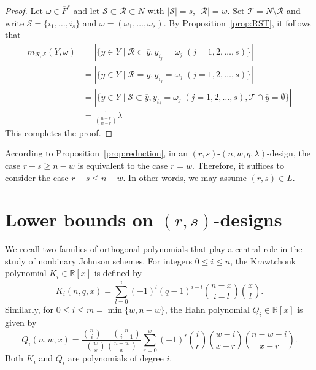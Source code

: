 \documentclass[a4paper, 11pt]{article}
\theoremstyle{definition}
\begin{document}
\begin{proof}
Let $\omega \in \overline{F}^{s}$ and let $\mathcal{S} \subset \mathcal{R} \subset N$ with $|\mathcal{S}| = s$, $|\mathcal{R}| = w$.
Set $\mathcal{T} = N \setminus \mathcal{R}$
and write $\mathcal{S} = \{i_1,\ldots,i_s\}$ and $\omega = (\omega_1,\ldots,\omega_s)$.
By Proposition~\ref{prop:RST}, it follows that
\begin{align*}
m_{\mathcal{R},\mathcal{S}}(Y,\omega) &= |\{y \in Y \mid \mathcal{R} \subset \overline{y}, y_{i_j} = \omega_j \; (j = 1,2,\ldots,s)\}| \\
&= |\{y \in Y \mid \mathcal{R} = \overline{y}, y_{i_j} = \omega_j \; (j = 1,2,\ldots,s)\}| \\
&= |\{y \in Y \mid \mathcal{S} \subset \overline{y}, y_{i_j} = \omega_j \; (j = 1,2,\ldots,s), \mathcal{T} \cap \overline{y} = \emptyset\}| \\
&= \frac{1}{\binom{n-r}{w-r}} \lambda
\end{align*}
This completes the proof.
\end{proof}

According to Proposition~\ref{prop:reduction}, in an $(r,s)$-$(n, w, q, \lambda)$-design, the case $r-s \ge n-w$ is equivalent to the case $r = w$.
Therefore, it suffices to consider the case $r-s \le n-w$.
In other words, we may assume $(r,s) \in L$.

\section{Lower bounds on $(r,s)$-designs} \label{sec:5}
We recall two families of orthogonal polynomials that play a central role in the study of nonbinary Johnson schemes.
For integers $0 \le i \le n$, the Krawtchouk polynomial $K_i \in \mathbb{R}[x]$ is defined by
\[
K_i(n,q,x) = \sum_{l=0}^i (-1)^l (q-1)^{i-l}\binom{n-x}{i-l}\binom{x}{l}.
\]
Similarly, for $0 \le i \le m = \min\{w,n-w\}$, the Hahn polynomial $Q_i \in \mathbb{R}[x]$ is given by
\[
Q_i(n,w,x) = \frac{\binom{n}{i} - \binom{n}{i-1}}{\binom{w}{x}\binom{n-w}{x}}\sum_{r=0}^x (-1)^r \binom{i}{r}\binom{w-i}{x-r}\binom{n-w-i}{x-r}.
\]
Both $K_i$ and $Q_i$ are polynomials of degree $i$.
\end{document}
